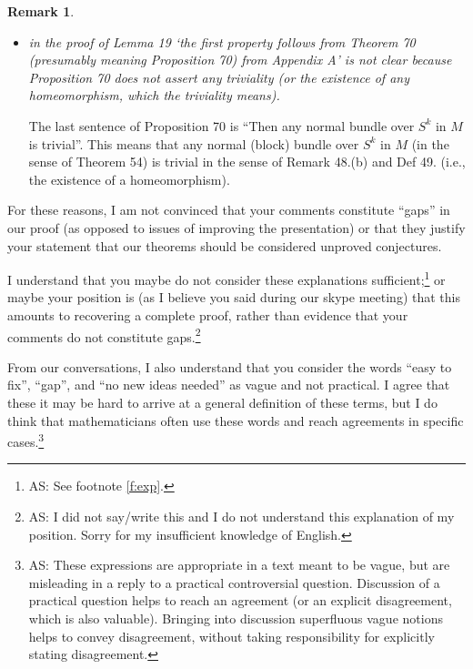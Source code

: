\documentclass[12pt]{article}
\theoremstyle{plain}
\theoremstyle{definition}
\newtheorem{Remark}[Theorem]{Remark}
\begin{document}
{\begin{Remark}
\begin{itemize}
The block bundle in question is $\sigma^r \times \varepsilon [-1,1]^{d-s_r}$,
which exists by unknottedness in codimension 3.

\item \emph{in the proof of Lemma 19 `the first property follows from Theorem 70 (presumably meaning Proposition 70) from Appendix A' is not clear because Proposition 70 does not assert any triviality (or the existence of any homeomorphism, which the triviality means).}

The last sentence of Proposition 70 is ``Then any normal bundle over $S^k$ in $M$ is trivial''. This means that any normal (block) bundle over $S^k$ in $M$ (in the sense of Theorem 54) is trivial in the sense of Remark 48.(b) and Def 49. (i.e., the existence of a homeomorphism).
\end{itemize}


For these reasons, I am not convinced that your comments constitute ``gaps'' in our proof
(as opposed to issues of improving the presentation) or that they justify your statement
that our theorems should be considered unproved conjectures.

I understand that you maybe do not consider these explanations sufficient;\footnote{AS: See footnote \ref{f:exp}.}
or maybe your position is (as I believe you said during our skype meeting) that this amounts to
recovering a complete proof, rather than evidence that your comments do not constitute gaps.\footnote{AS: I did not say/write this and I do not understand this explanation of my position.
Sorry for my insufficient knowledge of English.}

From our conversations, I also understand that you consider the words ``easy to fix'', ``gap'',
and ``no new ideas needed'' as vague and not practical. I agree that these it may be hard
to arrive at a general definition of these terms, but I do think that mathematicians often use
these words and reach agreements in specific cases.\footnote{AS: These expressions
are appropriate in a text meant to be vague, but are misleading in a reply to a practical controversial question.
Discussion of a practical question helps to reach an agreement (or an explicit disagreement, which is also valuable).
Bringing into discussion superfluous vague notions helps to convey disagreement,  without taking responsibility for explicitly stating disagreement.}


\end{Remark}}
\end{document}
